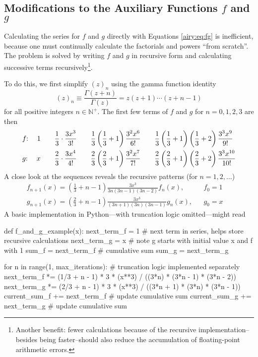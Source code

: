 \documentclass[11pt, a4paper]{article}
\begin{document}
\subsection{Modifications to the Auxiliary Functions $ f $ and $ g $}
Calculating the series for $ f $ and $ g $ directly with Equations \ref{airy:eq:fg} is inefficient, because one must continually calculate the factorials and powers ``from scratch''. The problem is solved by writing $ f $ and $ g $ in recursive form and calculating successive terms recursively\footnote{Another benefit: fewer calculations because of the recursive implementation--besides being faster--should also reduce the accumulation of floating-point arithmetic errors.}.

To do this, we first simplify $ (z)_{n} $ using the gamma function identity
\begin{equation*}
	(z)_{n} \equiv \frac{\Gamma(z+n)}{\Gamma(z)} = z(z+1)\cdots(z+n-1)
\end{equation*}
for all positive integers $ n \in \mathbb{N}^{+} $. The first few terms of $ f $ and $ g $ for $ n = 0, 1, 2, 3 $ are then
\begin{align*}
	&f\hspace{-1mm}: \quad 1 \qquad \frac{1}{3} \cdot \frac{3x^{3}}{3!} \qquad \frac{1}{3}\left(\frac{1}{3}+1\right)\frac{3^{2}x^{6}}{6!} \qquad \frac{1}{3}\left(\frac{1}{3}+1\right)\left(\frac{1}{3}+2\right)\frac{3^{3}x^{9}}{9!}\\
	&g\hspace{-1mm}: \quad x \qquad \frac{2}{3} \cdot \frac{3x^{4}}{4!} \qquad \frac{2}{3}\left(\frac{2}{3}+1\right)\frac{3^{2}x^{7}}{7!} \qquad \frac{2}{3}\left(\frac{2}{3}+1\right)\left(\frac{2}{3}+2\right)\frac{3^{3}x^{10}}{10!}
\end{align*}
A close look at the sequences reveals the recursive patterns (for $ n = 1, 2, \ldots $)
\begin{align*}
	&f_{n+1}(x) = \left(\frac{1}{3} + n - 1\right)\frac{3x^{3}}{3n(3n-1)(3n-2)}f_{n}(x) , && f_{0} = 1 \qquad \\
	&g_{n+1}(x) = \left(\frac{2}{3} + n - 1\right)\frac{3x^{3}}{(3n+1)(3n)(3n-1)}g_{n}(x), && g_{0} = x \qquad
\end{align*}
A basic implementation in Python---with truncation logic omitted---might read
\begin{myminted}
def f_and_g_example(x):
    next_term_f = 1    # next term in series, helps store recursive calculations
    next_term_g = x    # note g starts with initial value x and f with 1
    sum_f = next_term_f  # cumulative sum
    sum_g = next_term_g
    
    for n in range(1, max_iterations): 	# truncation logic implemented separately
        next_term_f *= (1/3 + n - 1) * 3 * (x**3) / ((3*n) * (3*n - 1) * (3*n - 2))
        next_term_g *= (2/3 + n - 1) * 3 * (x**3) / ((3*n + 1) * (3*n) * (3*n - 1))
        current_sum_f += next_term_f    # update cumulative sum
        current_sum_g += next_term_g    # update cumulative sum
\end{myminted}
\end{document}
